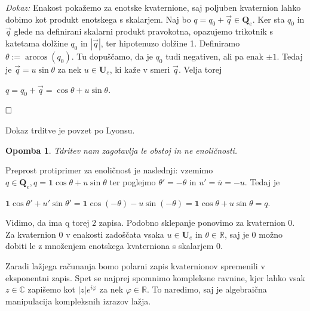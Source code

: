 \documentclass[a4paper,12pt]{article}
\def\R{\mathbb{R}} %
\def\C{\mathbb{C}} %
\def\Qe{\textbf{Q}_{e}} %
\def\Ue{\textbf{U}_{e}} %
\def\1{\textbf{1}}
\newcommand{\conj}[1]{\overline{#1}}
\def\qed{$\hfill\Box$}   %
\newtheorem{opomba}{Opomba}
\begin{document}
\noindent
{\em Dokaz: \/}Enakost pokažemo za enotske kvaternione, saj poljuben kvaternion lahko dobimo kot produkt enotskega s skalarjem.
Naj bo $q = q_{0} + \vec{q} \in \Qe$. Ker sta $q_{0}$ in $\vec{q}$ glede na definirani skalarni produkt pravokotna, opazujemo trikotnik s katetama dolžine $q_{0}$ in $|\vec{q}|$, ter hipotenuzo dolžine 1.
Definiramo $\theta := \arccos(q_{0})$. Tu dopuščamo, da je $q_{0}$ tudi negativen, ali pa enak $\pm 1$. Tedaj je $\vec{q} = u\sin\theta$ za nek $u \in \Ue$, ki kaže v smeri $\vec{q}$.
Velja torej
\begin{center}
   $q = q_{0} + \vec{q} = \cos\theta + u\sin\theta$.
\end{center}
\qed

\noindent Dokaz trditve je povzet po Lyonsu. \cite{2021Quaternions}
\begin{opomba}
Tdritev nam zagotavlja \emph{le obstoj} in ne enoličnosti.
\end{opomba}
\break
Preprost protiprimer za enoličnost je naslednji: vzemimo $q \in \Qe, q = \1\cos\theta + u\sin\theta$ ter poglejmo
$\theta' = -\theta$ in $u' = \conj{u} = -u$. Tedaj je
\begin{center}
   $\1\cos\theta' + u'\sin\theta' = \1\cos(-\theta) -u\sin(-\theta) = \1\cos\theta + u\sin\theta = q$.
\end{center}
Vidimo, da ima q torej $2$ zapisa. Podobno sklepanje ponovimo za kvaternion 0. Za kvaternion 0 v enakosti zadoščata vsaka $u \in \Ue$ in $\theta \in \R$, saj je 0 možno dobiti le z množenjem enotskega kvaterniona
s skalarjem 0.
   
Zaradi lažjega računanja bomo polarni zapis kvaternionov spremenili v eksponentni zapis. Spet se najprej spomnimo kompleksne ravnine, kjer lahko
vsak $z \in \C$ zapišemo kot $|z|e^{i\varphi}$ za nek $\varphi \in \R$. To naredimo, saj je
algebraična manipulacija kompleksnih izrazov lažja.
\end{document}
